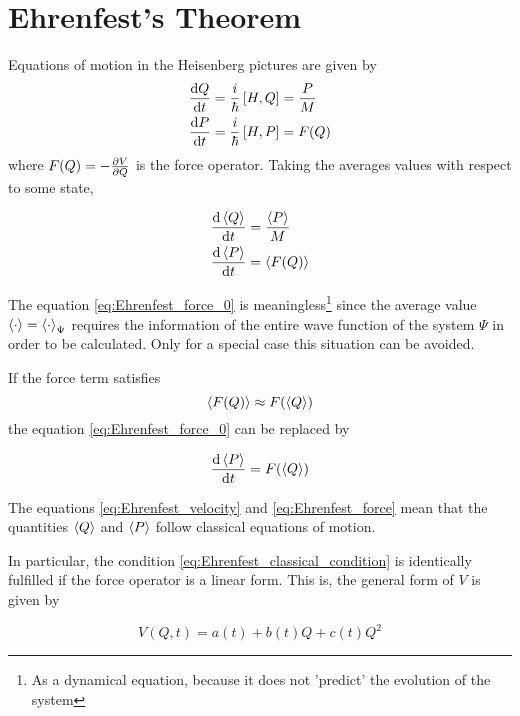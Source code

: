 \section{Ehrenfest's Theorem}

Equations of motion in the Heisenberg pictures are given by
\begin{align}
    \frac{\text d Q}{\text d t} &= \dfrac{i}{\hbar} \left[H, Q\right] = \dfrac{P}{M} \label{eq:eq_of_motion_Q}\\
    \frac{\text d P}{\text d t} &= \dfrac{i}{\hbar} \left[H, P\right] = F(Q) \label{eq:eq_of_motion_P}
\end{align}
where $F(Q) = -\frac{\partial V}{\partial Q}$ is the force operator.
Taking the averages values with respect to some state,

\begin{align}
    \frac{\text d \left\langle Q \right\rangle}{\text d t} &= \dfrac{\left\langle P \right\rangle}{M} \label{eq:Ehrenfest_velocity}\\
    \frac{\text d \left\langle P \right\rangle}{\text d t} &= \left\langle F(Q) \right\rangle \label{eq:Ehrenfest_force_0}
\end{align}

The equation \eqref{eq:Ehrenfest_force_0} is meaningless\footnote{As a dynamical equation, because it does not 'predict' the evolution of the system} since the average value $\left\langle \cdot \right\rangle = \left\langle \cdot \right\rangle_{\Psi}$ requires the information of the entire wave function of the system $\Psi$ in order to be calculated. Only for a special case this situation can be avoided.

If the force term satisfies
 \begin{equation}
    \left\langle F(Q) \right\rangle \approx F(\left\langle Q \right\rangle)\label{eq:Ehrenfest_classical_condition}
 \end{equation}
the equation \eqref{eq:Ehrenfest_force_0} can be replaced by

\begin{equation}
    \frac{\text d \left\langle P \right\rangle}{\text d t} = F(\left\langle Q \right\rangle)\label{eq:Ehrenfest_force}
\end{equation}

The equations \eqref{eq:Ehrenfest_velocity} and \eqref{eq:Ehrenfest_force} mean that the quantities $\left\langle Q \right\rangle$ and $\left\langle P \right\rangle$ follow classical equations of motion. \cite{ballentineQuantumMechanicsModern2010}

In particular, the condition \eqref{eq:Ehrenfest_classical_condition} is identically fulfilled if the force operator is a linear form. This is, the general form of $V$ is given by

\begin{equation}
    V(Q, t) = a(t) + b(t)Q + c(t)Q^2
\end{equation}

